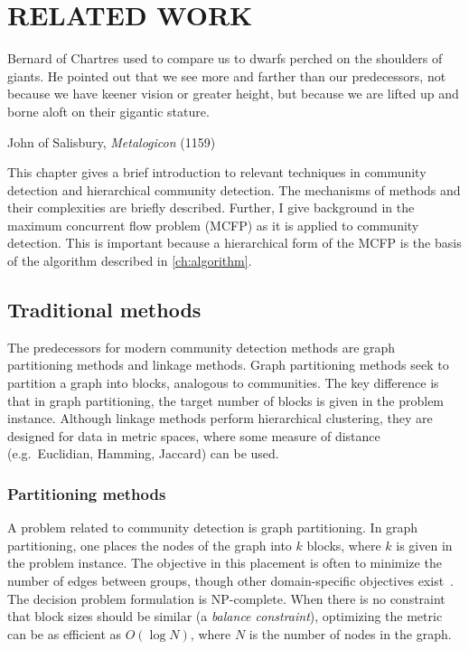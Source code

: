 \chapter{RELATED WORK} \label{ch:literature}%

\epigraph{Bernard of Chartres used to compare us to dwarfs perched on the shoulders of giants. He pointed out that we see more and farther than our predecessors, not because we have keener vision or greater height, but because we are lifted up and borne aloft on their gigantic stature.}{John of Salisbury, \emph{Metalogicon} (1159)}

\noindent This chapter gives a brief introduction to relevant techniques in community detection and hierarchical community detection. The mechanisms of methods and their complexities are briefly described. Further, I give background in the maximum concurrent flow problem (MCFP) as it is applied to community detection. This is important because a hierarchical form of the MCFP is the basis of the algorithm described in \autoref{ch:algorithm}.

\section{Traditional methods}

The predecessors for modern community detection methods are graph partitioning methods and linkage methods. Graph partitioning methods seek to partition a graph into blocks, analogous to communities. The key difference is that in graph partitioning, the target number of blocks is given in the problem instance. Although linkage methods perform hierarchical clustering, they are designed for data in metric spaces, where some measure of distance (e.g.\ Euclidian, Hamming, Jaccard) can be used.

\subsection{Partitioning methods}

A problem related to community detection is graph partitioning. In graph partitioning, one places the nodes of the graph into $k$ blocks, where $k$ is given in the problem instance. The objective in this placement is often to minimize the number of edges between groups, though other domain-specific objectives exist~\cite{bulucc2013recent}. The decision problem formulation is NP-complete. When there is no constraint that block sizes should be similar (a \emph{balance constraint}), optimizing the metric can be as efficient as $O(\log N)$, where $N$ is the number of nodes in the graph. 

